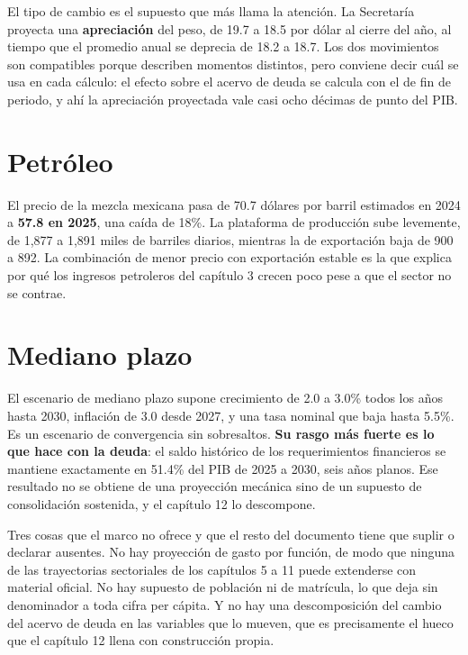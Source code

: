 El tipo de cambio es el supuesto que más llama la atención. La Secretaría proyecta
una \textbf{apreciación} del peso, de 19.7 a 18.5 por dólar al cierre del año, al
tiempo que el promedio anual se deprecia de 18.2 a 18.7. Los dos movimientos son
compatibles porque describen momentos distintos, pero conviene decir cuál se usa
en cada cálculo: el efecto sobre el acervo de deuda se calcula con el de fin de
periodo, y ahí la apreciación proyectada vale casi ocho décimas de punto del PIB.

\section{Petróleo}

El precio de la mezcla mexicana pasa de 70.7 dólares por barril estimados en 2024
a \textbf{57.8 en 2025}, una caída de 18\%. La plataforma de producción sube
levemente, de 1,877 a 1,891 miles de barriles diarios, mientras la de exportación
baja de 900 a 892. La combinación de menor precio con exportación estable es la
que explica por qué los ingresos petroleros del capítulo 3 crecen poco pese a que
el sector no se contrae.

\section{Mediano plazo}



El escenario de mediano plazo supone crecimiento de 2.0 a 3.0\% todos los años
hasta 2030, inflación de 3.0 desde 2027, y una tasa nominal que baja hasta 5.5\%.
Es un escenario de convergencia sin sobresaltos. \textbf{Su rasgo más fuerte es lo
que hace con la deuda}: el saldo histórico de los requerimientos financieros se
mantiene exactamente en 51.4\% del PIB de 2025 a 2030, seis años planos. Ese
resultado no se obtiene de una proyección mecánica sino de un supuesto de
consolidación sostenida, y el capítulo 12 lo descompone.

Tres cosas que el marco no ofrece y que el resto del documento tiene que suplir o
declarar ausentes. No hay proyección de gasto por función, de modo que ninguna de
las trayectorias sectoriales de los capítulos 5 a 11 puede extenderse con material
oficial. No hay supuesto de población ni de matrícula, lo que deja sin denominador
a toda cifra per cápita. Y no hay una descomposición del cambio del acervo de
deuda en las variables que lo mueven, que es precisamente el hueco que el capítulo
12 llena con construcción propia.

\clearpage
